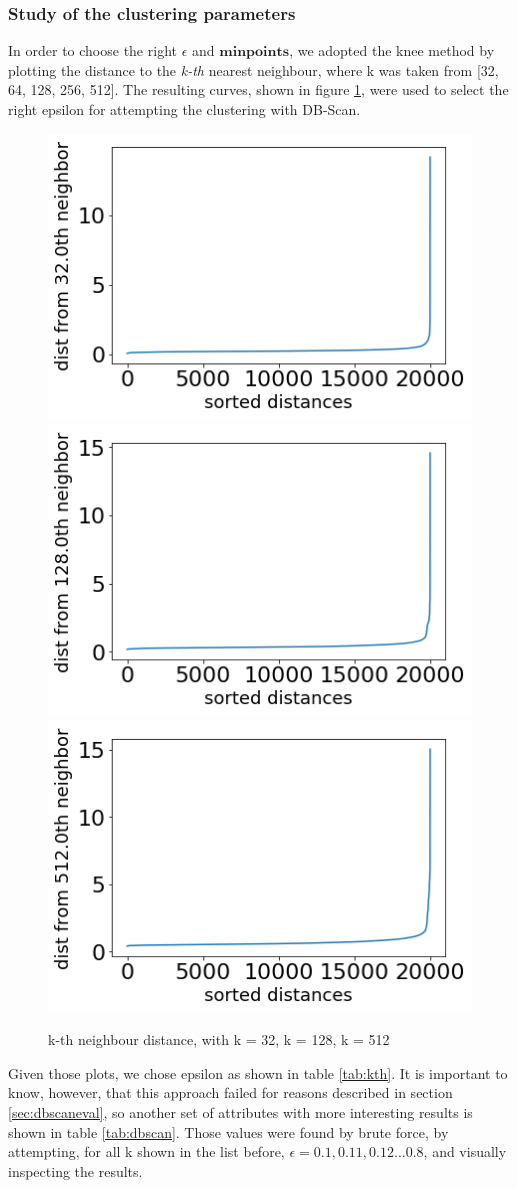 \documentclass{article}
\begin{document}
	\subsubsection{Study of the clustering parameters}
	In order to choose the right $\epsilon$ and $\mathbf{min points}$, we adopted the knee method by plotting the distance to the \emph{k-th} nearest neighbour, where k was taken from [32, 64, 128, 256, 512]. The resulting curves, shown in figure \ref{fig:kth}, were used to select the right epsilon for attempting the clustering with DB-Scan. 
	\begin{figure}[H]
		\centering
		\includegraphics[width=.32\textwidth]{a32}\hfill
		\includegraphics[width=.32\textwidth]{a128}\hfill
		\includegraphics[width=.32\textwidth]{a512}
		\caption{k-th neighbour distance, with k = 32, k = 128, k = 512}
		\label{fig:kth}
	\end{figure}
	Given those plots, we chose epsilon as shown in table \ref{tab:kth}.
	It is important to know, however, that this approach failed for reasons described in section \ref{sec:dbscaneval}, so another set of attributes with more interesting results is shown in table \ref{tab:dbscan}. Those values were found by brute force, by attempting, for all k shown in the list before, $\epsilon = 0.1, 0.11, 0.12\dots 0.8$, and visually inspecting the results.\\
	
\end{document}
